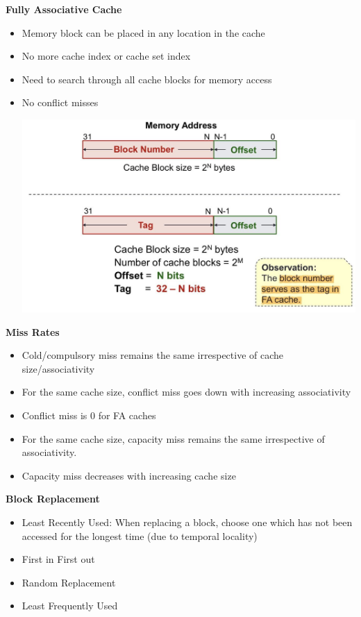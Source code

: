 \documentclass[a4paper]{article} \usepackage[backend=biber, style=numeric, sorting=none]{biblatex}
\begin{document}
\begin{multicols*}{4}
\textbf{{Fully Associative Cache}}
\begin{itemize}
\item Memory block can be placed in any location in the cache
\item No more cache index or cache set index
\item Need to search through all cache blocks for memory access
\item No conflict misses
\begin{center}
    \includegraphics[scale=0.13]{FAC}
\end{center}
\end{itemize}

\textbf{{Miss Rates}}
\begin{itemize}
\item Cold/compulsory miss remains the same irrespective of cache size/associativity
\item For the same cache size, conflict miss goes down with increasing associativity
\item Conflict miss is 0 for FA caches
\item For the same cache size, capacity miss remains the same irrespective of associativity.
\item Capacity miss decreases with increasing cache size\\
\end{itemize}

\textbf{{Block Replacement}}
\begin{itemize}
\item Least Recently Used: When replacing a block, choose one which has not been accessed for the longest time (due to temporal locality)
\item First in First out
\item Random Replacement
\item Least Frequently Used
\end{itemize}


\end{multicols*}
\end{document}
